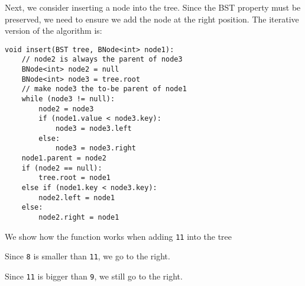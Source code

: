 \documentclass[a4paper, openany]{memoir}
\begin{document}
\noindent Next, we consider inserting a node into the tree. Since the BST property must be preserved, we need to ensure we add the node at the right position. The iterative version of the algorithm is:
\begin{lstlisting}[language=pseudocode]
void insert(BST tree, BNode<int> node1):
    // node2 is always the parent of node3
    BNode<int> node2 = null
    BNode<int> node3 = tree.root
    // make node3 the to-be parent of node1
    while (node3 != null):
        node2 = node3
        if (node1.value < node3.key):
            node3 = node3.left
        else:
            node3 = node3.right
    node1.parent = node2
    if (node2 == null):
        tree.root = node1
    else if (node1.key < node3.key):
        node2.left = node1
    else:
        node2.right = node1
\end{lstlisting}
We show how the function works when adding \texttt{11} into the tree
\begin{center}
\end{center}
Since \texttt{8} is smaller than \texttt{11}, we go to the right.
\begin{center}
\end{center}
Since \texttt{11} is bigger than \texttt{9}, we still go to the right.
\end{document}
